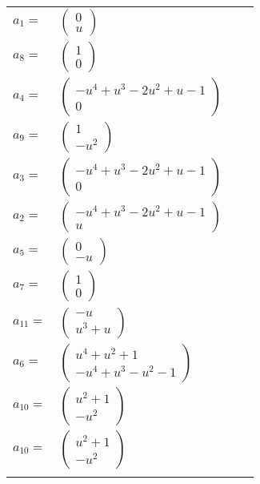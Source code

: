 \documentclass[1p]{elsarticle_modified}
\theoremstyle{definition}
\begin{document}
\begin{tabular}{m{7pt} m{180pt} m{7pt} m{180pt} }
\flushright $a_{1}=$&$\begin{pmatrix}0\\u\end{pmatrix}$ \\
\flushright $a_{8}=$&$\begin{pmatrix}1\\0\end{pmatrix}$ \\
\flushright $a_{4}=$&$\begin{pmatrix}- u^4+u^3-2 u^2+u-1\\0\end{pmatrix}$ \\
\flushright $a_{9}=$&$\begin{pmatrix}1\\- u^2\end{pmatrix}$ \\
\flushright $a_{3}=$&$\begin{pmatrix}- u^4+u^3-2 u^2+u-1\\0\end{pmatrix}$ \\
\flushright $a_{2}=$&$\begin{pmatrix}- u^4+u^3-2 u^2+u-1\\u\end{pmatrix}$ \\
\flushright $a_{5}=$&$\begin{pmatrix}0\\- u\end{pmatrix}$ \\
\flushright $a_{7}=$&$\begin{pmatrix}1\\0\end{pmatrix}$ \\
\flushright $a_{11}=$&$\begin{pmatrix}- u\\u^3+u\end{pmatrix}$ \\
\flushright $a_{6}=$&$\begin{pmatrix}u^4+u^2+1\\- u^4+u^3- u^2-1\end{pmatrix}$ \\
\flushright $a_{10}=$&$\begin{pmatrix}u^2+1\\- u^2\end{pmatrix}$\\ \flushright $a_{10}=$&$\begin{pmatrix}u^2+1\\- u^2\end{pmatrix}$\\&\end{tabular}
\end{document}
